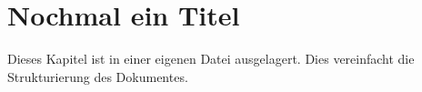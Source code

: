 \section{Nochmal ein Titel}
Dieses Kapitel ist in einer eigenen Datei ausgelagert. Dies vereinfacht die 
Strukturierung des Dokumentes. 

